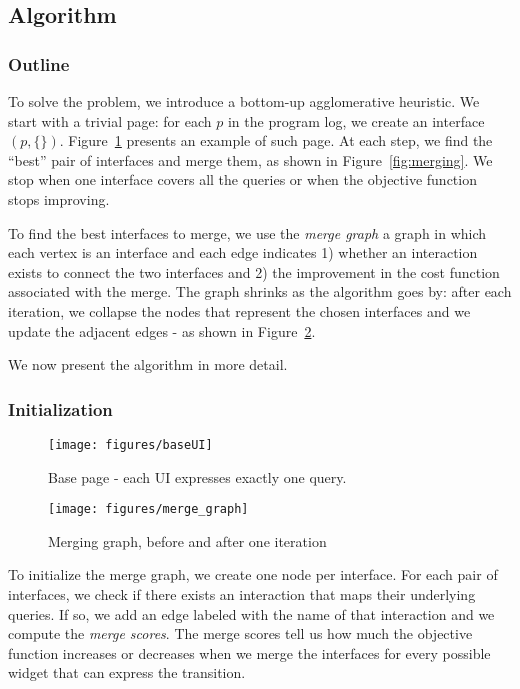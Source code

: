 \iffalse
	\subsection{Algorithm}
	\subsubsection{Outline}
	To solve the problem, we introduce a bottom-up agglomerative heuristic. We start with a trivial page: for each $p$ in the program log, we create an interface $(p, \{\})$. Figure~\ref{fig:basepage} presents an example of such page. At each step, we find the ``best'' pair of interfaces and merge them, as shown in Figure~\ref{fig:merging}. We stop when one interface covers all the queries or when the objective function stops improving.

	To find the best interfaces to merge, we use the \emph{merge graph} a graph in which each vertex is an interface and each edge indicates 1) whether an interaction exists to connect the two interfaces and 2) the improvement in the cost function associated with the merge. The graph shrinks as the algorithm goes by: after each iteration, we collapse the nodes that represent the chosen interfaces and we update the adjacent edges - as shown in Figure~\ref{fig:graph}.

	We now present the algorithm in more detail.

	\subsubsection{Initialization}
	\begin{figure}[t]
		\centering
		\texttt{[image: figures/baseUI]}
		\caption{Base page - each UI expresses exactly one query. }
		\label{fig:basepage}
	\end{figure}

	\begin{figure}[t]
		\centering
		\texttt{[image: figures/merge\_graph]}
		\caption{Merging graph, before and after one iteration}
		\label{fig:graph}
	\end{figure}
	To initialize the merge graph, we create one node per interface. For each pair of interfaces, we check if there exists an interaction that maps their underlying queries. If so, we add an edge labeled with the name of that interaction and we compute the \emph{merge scores}. The merge scores tell us how much the objective function increases or decreases when we merge the interfaces for every possible widget that can express the transition.


